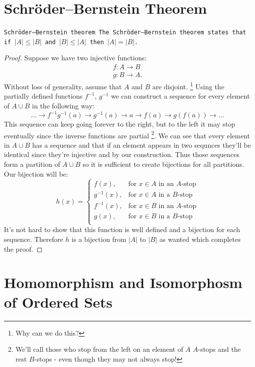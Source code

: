 \documentclass[11pt,a4paper]{article}
\begin{document}
\newpage
\section{Schröder--Bernstein Theorem}
\begin{theorem}\tt{Schröder--Bernstein theorem}
The Schröder--Bernstein theorem states that if $|A| \le |B|$ and 
$|B| \le |A|$ then $|A| = |B|$.
\end{theorem}
\begin{proof}
Suppose we have two injective functions:
\begin{align*}
f \colon A \rightarrow B \\
g \colon B \rightarrow A.
\end{align*}
Without loss of generality, assume that $A$ and $B$ are disjoint.
\footnote{Why can we do this?}
Using the partially defined functions $f^{-1}$, $g^{-1}$ we can construct 
a sequence for every element of $A \cup B$ in the following way:
\[
	\ldots \to f^{-1}g^{-1}(a) \to g^{-1}(a) 
	\to a \to f(a) \to g(f(a)) \to \ldots
\]
This sequence can keep going forever to the right, but to the left it 
may stop eventually since the inverse functions are partial
\footnote{We'll call those who stop from the left on an element 
of $A$ $A$-stops and the rest $B$-stops - even though they may not 
always stop!}. 
We can see that every element in $A \cup B$ has a sequence and that 
if an element appears in two sequnces they'll be identical since 
they're injective and by our construction. Thus those sequences form 
a partition of $A \cup B$ so it is sufficient to create bijections 
for all partitions. Our bijection will be:
\[
    h(x) = \begin{cases}
        f(x), & \text{for } x\in A\text{ in an $A$-stop}\\
        g^{-1}(x), & \text{for } x\in A\text{ in a $B$-stop}\\
        f^{-1}(x), & \text{for } x\in B\text{ in an $A$-stop}\\
        g(x), & \text{for } x\in B\text{ in a $B$-stop}\\
        \end{cases}
\]
It's not hard to show that this function is well defined and a bijection
for each sequence.
Therefore $h$ is a bijection from $|A|$ to $|B|$ as wanted which completes
the proof.
\end{proof}

\newpage

\section{Homomorphism and Isomorphosm of Ordered Sets}
\end{document}
